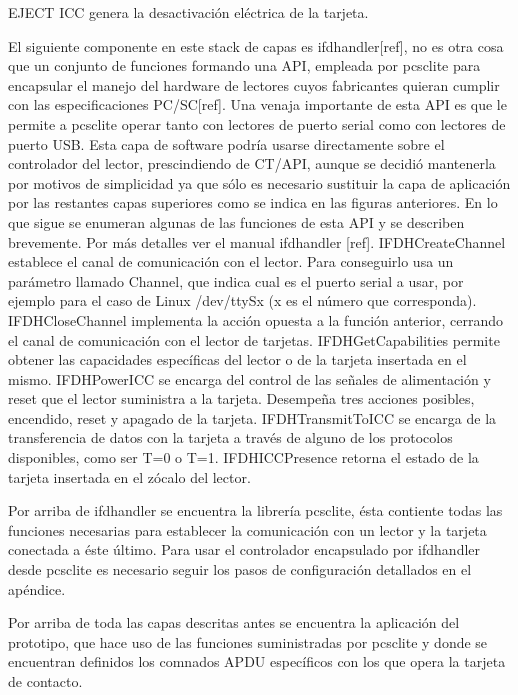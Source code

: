 EJECT ICC genera la desactivación eléctrica de la tarjeta.

\bigskip
{}
El siguiente componente en este stack de capas es ifdhandler[ref], no es otra cosa que un conjunto de funciones formando una API, empleada por pcsclite para encapsular el manejo del hardware de  lectores cuyos fabricantes quieran cumplir con las especificaciones PC/SC[ref]. Una venaja importante de esta API es que le permite a pcsclite operar tanto con lectores de puerto serial como con lectores de puerto USB.
Esta capa de software podría usarse directamente sobre el controlador del lector, prescindiendo de CT/API, aunque se decidió mantenerla por motivos de simplicidad ya que sólo es necesario sustituir la capa de aplicación por las restantes capas superiores como se indica en las figuras anteriores.
En lo que sigue se enumeran algunas de las funciones de esta API y se describen brevemente. Por más detalles ver el manual ifdhandler [ref].
IFDHCreateChannel establece el canal de comunicación con el lector. Para conseguirlo usa un parámetro llamado Channel, que indica cual es el puerto serial a usar, por ejemplo para el caso de Linux /dev/ttySx (x es el número que corresponda).
IFDHCloseChannel implementa la acción opuesta a la función anterior, cerrando el canal de comunicación con el lector de tarjetas.
IFDHGetCapabilities permite obtener las capacidades específicas del lector o de la tarjeta insertada en el mismo.
IFDHPowerICC se encarga del control de las señales de alimentación y reset que el lector suministra a la tarjeta. Desempeña tres acciones posibles, encendido, reset y apagado de la tarjeta.
IFDHTransmitToICC se encarga de la transferencia de datos con la tarjeta a través de alguno de los protocolos disponibles, como ser T=0 o T=1.
IFDHICCPresence retorna el estado de la tarjeta insertada en el zócalo del lector.

\bigskip
{}
Por arriba de ifdhandler se encuentra la librería pcsclite, ésta contiente todas las funciones necesarias para establecer la comunicación con un lector y la tarjeta conectada a éste último. Para usar el controlador encapsulado por ifdhandler desde pcsclite es necesario seguir los pasos de configuración detallados en el apéndice.

\bigskip
{}
Por arriba de toda las capas descritas antes se encuentra la aplicación del prototipo, que hace uso de las funciones suministradas por pcsclite y donde se encuentran definidos los comnados APDU específicos con los que opera la tarjeta de contacto.


